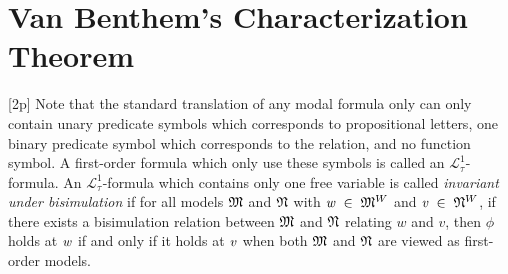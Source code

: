 \documentclass{llncs}
\renewcommand{\HOLinline}[1]{\ensuremath{#1}}
\begin{document}
\section{Van Benthem's Characterization Theorem}[2p]
Note that the standard translation of any modal formula only can only contain unary predicate symbols which corresponds to propositional letters, one binary predicate symbol which corresponds to the relation, and no function symbol. A first-order formula which only use these symbols is called an ${\mathcal L}_{\tau}^1$-formula. An ${\mathcal L}_{\tau}^1$-formula which contains only one free variable is called \emph{invariant under bisimulation} if for all models \HOLinline{\HOLFreeVar{\ensuremath{\mathfrak{M}}}} and \HOLinline{\HOLFreeVar{\ensuremath{\mathfrak{N}}}} with \HOLinline{\HOLFreeVar{w}\;\HOLSymConst{\HOLTokenIn{}}\;\HOLFreeVar{\ensuremath{\mathfrak{M}}}\HOLSymConst{\ensuremath{\sp{W}}}} and \HOLinline{\HOLFreeVar{v}\;\HOLSymConst{\HOLTokenIn{}}\;\HOLFreeVar{\ensuremath{\mathfrak{N}}}\HOLSymConst{\ensuremath{\sp{W}}}}, if there exists a bisimulation relation between \HOLinline{\HOLFreeVar{\ensuremath{\mathfrak{M}}}} and \HOLinline{\HOLFreeVar{\ensuremath{\mathfrak{N}}}} relating $w$ and $v$, then $\phi$ holds at \HOLinline{\HOLFreeVar{w}} if and only if it holds at \HOLinline{\HOLFreeVar{v}} when both \HOLinline{\HOLFreeVar{\ensuremath{\mathfrak{M}}}} and \HOLinline{\HOLFreeVar{\ensuremath{\mathfrak{N}}}} are viewed as first-order models.
\end{document}
